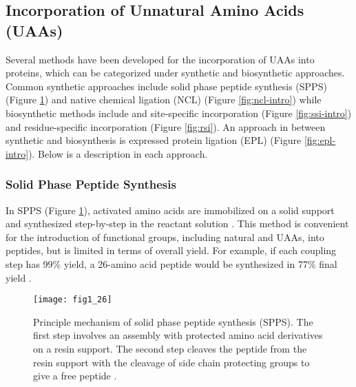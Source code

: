 \begin{refsection}
\subsection{Incorporation of Unnatural Amino Acids (UAAs)} 
\label{sec:rsi-intro}

Several methods have been developed for the incorporation of UAAs into
proteins, which can be categorized under synthetic and biosynthetic approaches.
Common synthetic approaches include solid phase peptide synthesis (SPPS)
(Figure \ref{fig:spps-intro}) and native chemical ligation (NCL) (Figure
\ref{fig:ncl-intro}) while biosynthetic methods include  and
 site-specific incorporation \cite{Cellitti2008,Hassan2008}
(Figure \ref{fig:ssi-intro}) and residue-specific incorporation
\cite{Johnson2010} (Figure \ref{fig:rsi}). An approach in between synthetic and
biosynthesis is expressed protein ligation (EPL) \cite{Muir1998} (Figure
\ref{fig:epl-intro}). Below is a description in each approach.

\subsubsection{Solid Phase Peptide Synthesis}

In SPPS  (Figure \ref{fig:spps-intro}), activated amino acids are
immobilized on a solid support and synthesized step-by-step in the reactant
solution \cite{Merrifield1963a}. This method is convenient for the introduction
of functional groups, including natural and UAAs, into
peptides, but is limited in terms of overall yield. For example, if each
coupling step has 99\% yield, a 26-amino acid peptide would be synthesized in
77\% final yield \cite{Chan2000}.  
\begin{figure}[htbp] \centering \texttt{[image: fig1\_26]}
    \caption[Principle mechanism of solid phase peptide synthesis (SPPS). The
    first step involves an assembly with protected amino acid derivatives on a
resin support. The second step cleaves the peptide from the resin support with
the cleavage of side chain protecting groups to give a free peptide.]{Principle
    mechanism of solid phase peptide synthesis (SPPS). The first step involves
    an assembly with protected amino acid derivatives on a resin support. The
    second step cleaves the peptide from the resin support with the cleavage of
    side chain protecting groups to give a free peptide
    \cite{Merrifield1963a,Mahto2011}.} 
    \label{fig:spps-intro} 
\end{figure}


\end{refsection}
